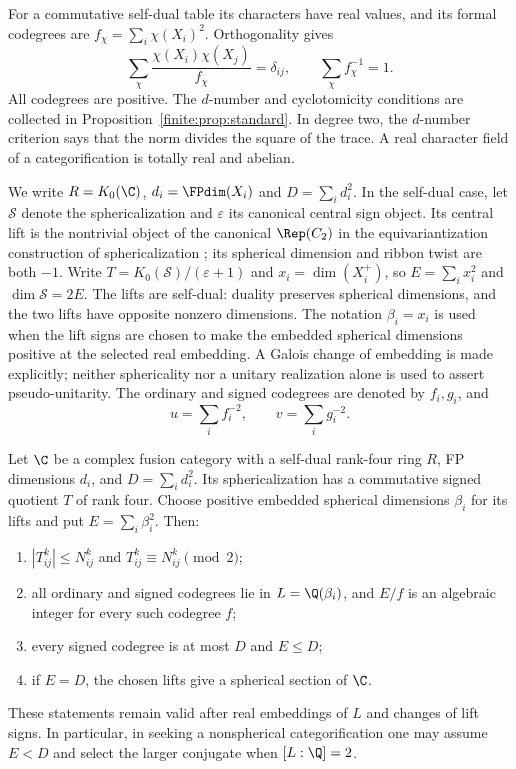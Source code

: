 For a commutative self-dual table its characters have real values,
and its formal codegrees are
$f_\chi=\sum_i\chi(X_i)^2$. Orthogonality gives
\begin{equation}\label{core:orthog}
\sum_\chi\frac{\chi(X_i)\chi(X_j)}{f_\chi}=\delta_{ij},
\qquad\sum_\chi f_\chi^{-1}=1.
\end{equation}
All codegrees are positive. The $d$-number and cyclotomicity conditions
are collected in Proposition~\ref{finite:prop:standard}. In degree two,
the $d$-number criterion says that the norm divides the square of the
trace. A real character field of a categorification is totally real
and abelian.

We write $R=K_0(\C)$, $d_i=\FPdim(X_i)$ and
$D=\sum_i d_i^2$. In the self-dual case, let $\mathcal S$ denote
the sphericalization and $\varepsilon$ its canonical central sign
object. Its central lift is the nontrivial object of the canonical
$\Rep(C_2)$ in the equivariantization construction of sphericalization
\cite[Section~5.3]{Bartlett}; its spherical dimension and ribbon twist
are both $-1$. Write $T=K_0(\mathcal S)/(\varepsilon+1)$ and
$x_i=\dim(X_i^+)$, so $E=\sum_i x_i^2$ and
$\dim\mathcal S=2E$. The lifts are self-dual: duality preserves
spherical dimensions, and the two lifts have opposite nonzero dimensions.
The notation $\beta_i=x_i$ is used when the lift signs are chosen
to make the embedded spherical dimensions positive at the selected real
embedding.
A Galois change of embedding is made explicitly; neither sphericality
nor a unitary realization alone is used to assert pseudo-unitarity. The ordinary and signed
codegrees are denoted by $f_i,g_i$, and
\[
u=\sum_i f_i^{-2},\qquad v=\sum_i g_i^{-2}.
\]
\begin{lemma}\label{core:lem:family-induction}
Let $\C$ be a complex fusion category with a self-dual
rank-four ring $R$, FP dimensions $d_i$, and $D=\sum_i d_i^2$.
Its sphericalization has a commutative signed quotient $T$ of rank
four. Choose positive embedded spherical dimensions $\beta_i$ for its lifts and
put $E=\sum_i\beta_i^2$. Then:
\begin{enumerate}
\item $|T_{ij}^k|\le N_{ij}^k$ and $T_{ij}^k\equiv N_{ij}^k\pmod2$;
\item all ordinary and signed codegrees lie in $L=\Q(\beta_i)$,
and $E/f$ is an algebraic integer for every such codegree $f$;
\item every signed codegree is at most $D$ and $E\le D$;
\item if $E=D$, the chosen lifts give a spherical section of
$\C$.
\end{enumerate}
These statements remain valid after real embeddings of $L$ and
changes of lift signs. In particular, in seeking a nonspherical
categorification one may assume $E<D$ and select the larger
conjugate when $[L:\Q]=2$.
\end{lemma}
